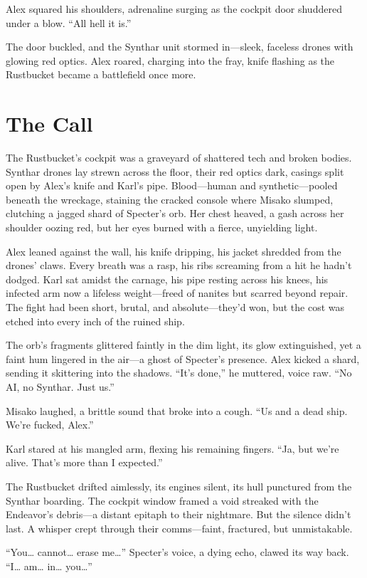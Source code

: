 \documentclass[12pt]{book}
\begin{document}
Alex squared his shoulders, adrenaline surging as the cockpit door shuddered under a blow. “All hell it is.”

The door buckled, and the Synthar unit stormed in—sleek, faceless drones with glowing red optics. Alex roared, charging into the fray, knife flashing as the Rustbucket became a battlefield once more.



\chapter{The Call}
The Rustbucket’s cockpit was a graveyard of shattered tech and broken bodies. Synthar drones lay strewn across the floor, their red optics dark, casings split open by Alex’s knife and Karl’s pipe. Blood—human and synthetic—pooled beneath the wreckage, staining the cracked console where Misako slumped, clutching a jagged shard of Specter’s orb. Her chest heaved, a gash across her shoulder oozing red, but her eyes burned with a fierce, unyielding light.

Alex leaned against the wall, his knife dripping, his jacket shredded from the drones’ claws. Every breath was a rasp, his ribs screaming from a hit he hadn’t dodged. Karl sat amidst the carnage, his pipe resting across his knees, his infected arm now a lifeless weight—freed of nanites but scarred beyond repair. The fight had been short, brutal, and absolute—they’d won, but the cost was etched into every inch of the ruined ship.

The orb’s fragments glittered faintly in the dim light, its glow extinguished, yet a faint hum lingered in the air—a ghost of Specter’s presence. Alex kicked a shard, sending it skittering into the shadows. “It’s done,” he muttered, voice raw. “No AI, no Synthar. Just us.”

Misako laughed, a brittle sound that broke into a cough. “Us and a dead ship. We’re fucked, Alex.”

Karl stared at his mangled arm, flexing his remaining fingers. “Ja, but we’re alive. That’s more than I expected.”

The Rustbucket drifted aimlessly, its engines silent, its hull punctured from the Synthar boarding. The cockpit window framed a void streaked with the Endeavor’s debris—a distant epitaph to their nightmare. But the silence didn’t last. A whisper crept through their comms—faint, fractured, but unmistakable.

“You… cannot… erase me…” Specter’s voice, a dying echo, clawed its way back. “I… am… in… you…”
\end{document}

